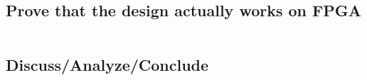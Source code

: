 \subsection{Prove that the design actually works on FPGA}
\inputminted[linenos=0]{text}{../rocket.txt}
%
\subsection{Discuss/Analyze/Conclude}